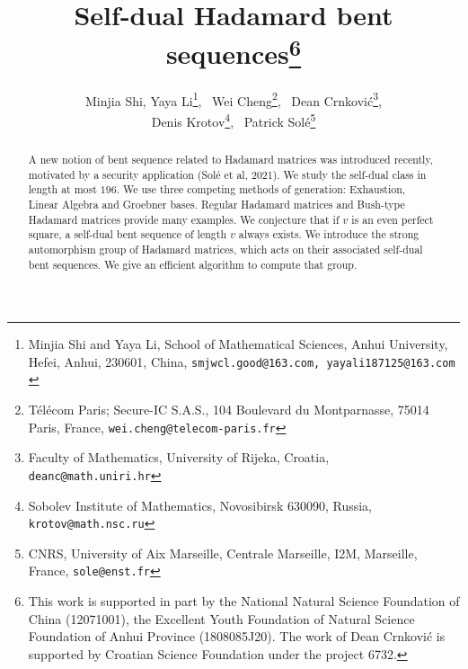 \documentclass[12pt]{article}
\begin{document}
\title{Self-dual Hadamard bent sequences\thanks{This work is supported in part by the National Natural Science
Foundation of China (12071001), the Excellent Youth Foundation of
Natural Science Foundation of Anhui Province (1808085J20). The work of Dean Crnkovi\'c
is supported by Croatian Science Foundation under the project 6732.}}

%



\author{
Minjia Shi,  Yaya Li\thanks{Minjia Shi and Yaya Li, School of Mathematical Sciences, Anhui University, Hefei, Anhui, 230601,
China, {\tt  smjwcl.good@163.com, yayali187125@163.com }}, \
Wei Cheng\thanks{T\'el\'ecom Paris; Secure-IC S.A.S., 104 Boulevard du Montparnasse, 75014 Paris, France, {\tt wei.cheng@telecom-paris.fr}}, \
Dean Crnkovi\'c\thanks{Faculty of Mathematics, University of Rijeka, Croatia, {\tt deanc@math.uniri.hr}}, \\
Denis Krotov\thanks{Sobolev Institute of Mathematics, Novosibirsk 630090, Russia, {\tt krotov@math.nsc.ru}}, \
Patrick Sol\'e\thanks{CNRS,  University of Aix Marseille, Centrale Marseille, I2M, Marseille, France, {\tt sole@enst.fr}}
}



\date{}

\maketitle
\begin{abstract}
A new notion of bent sequence related to Hadamard matrices was introduced recently, motivated by a security application (Sol\'e et al, 2021). We study the self-dual class in length at most $196$.
We use three competing methods of generation: Exhaustion, Linear Algebra and Groebner bases.
Regular Hadamard matrices and Bush-type Hadamard matrices provide many examples. We conjecture that if $v$ is an even perfect square, a self-dual bent sequence of length $v$ always exists.
We introduce  the strong automorphism group of Hadamard matrices, which acts on their associated self-dual bent sequences. We give an efficient algorithm to compute that group.
\end{abstract}
\end{document}

